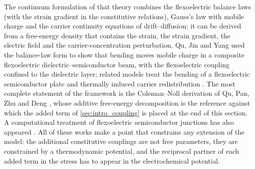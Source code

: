 The continuum formulation of that theory combines the flexoelectric balance laws (with the strain gradient in the constitutive relations), Gauss's law with mobile charge and the carrier
continuity equations of drift--diffusion; it can be derived from a free-energy density
that contains the strain, the strain gradient, the electric field and the
carrier-concentration perturbation.  Qu, Jin and Yang \cite{qu2020mobile} used the balance-law form to show
that bending moves mobile charge in a composite
flexoelectric dielectric--semiconductor beam, with the flexoelectric coupling confined to the dielectric layer; related models treat
the bending of a flexoelectric semiconductor plate \cite{qu2022bending} and
thermally induced carrier redistribution \cite{qu2022thermal}.  The
most complete statement of the framework is the Coleman--Noll derivation of Qu,
Pan, Zhu and Deng \cite{qu2025thermodynamic}, whose additive free-energy
decomposition is the reference against which the added term of
\cref{sec:intro_coupling} is placed at the end of this section.  A computational
treatment of flexoelectric semiconductor junctions has also appeared
\cite{hu2025computational}.  All of these works make a point that constrains any extension of the model: the additional constitutive couplings are not free
parameters, they are constrained by a thermodynamic potential, and the
reciprocal partner of each added term in the stress has to appear in the
electrochemical potential.

